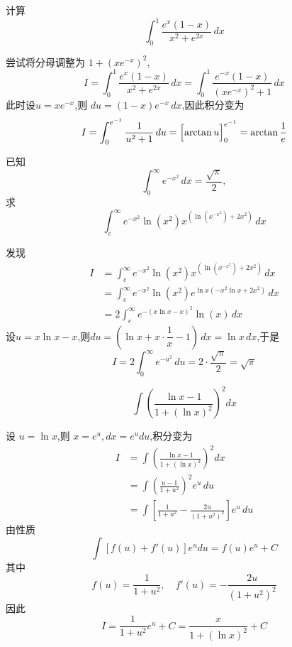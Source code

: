 \begin{questions}
    \question 计算
    \[
    \int_{0}^{1} \frac{e^{x}(1-x)}{x^2+e^{2x}} \, dx
    \]
    \begin{solution}
        尝试将分母调整为 $1+(xe^{-x})^2$,
        \[
        I=\int_{0}^{1} \frac{e^{x}(1-x)}{x^2+e^{2x}} \, dx = \int_{0}^{1} \frac{e^{-x}(1-x)}{(xe^{-x})^2+1} \, dx
        \]
        此时设$u = x e^{-x}$,则 $du = (1-x)e^{-x}\, dx$,因此积分变为
        \[
        I= \int_{0}^{e^{-1}} \frac{1}{u^2+1} \, du = \Bigl[\arctan u\Bigr]_{0}^{e^{-1}} = \arctan \frac{1}{e}
        \]
    \end{solution}

    \question 已知 
    \[
    \int_{0}^{\infty} e^{-x^2}\,dx = \frac{\sqrt{\pi}}{2},
    \]
    求
    \[
    \int_{e}^{\infty} e^{-x^2} \ln(x^2) x^{(\ln(x^{-x^2}) + 2x^2)}\,dx
    \]
    \begin{solution}
        发现
        \begin{align*} 
        I &= \int_{e}^{\infty} e^{-x^2} \ln(x^2) x^{(\ln(x^{-x^2}) + 2x^2)}\,dx \\
        &= \int_{e}^{\infty} e^{-x^2} \ln(x^2) e^{\ln x(-x^2 \ln x + 2x^2)}\,dx \\
        &= 2\int_{e}^{\infty} e^{-(x\ln x-x)^2} \ln(x) \,dx
        \end{align*}
        设$u=x\ln x -x$,则$du=\left(\ln x +x\cdot\dfrac{1}{x}-1\right)\,dx=\ln x \,dx$,于是
        \[
        I=2\int_{0}^{\infty}e^{-u^2}\,du=2\cdot\frac{\sqrt{\pi}}{2}=\sqrt{\pi}
        \]
    \end{solution}

    \question 
    \[ 
    \int \left( \frac{\ln x - 1}{1 + (\ln x)^2} \right)^2 dx 
    \]
    \begin{solution}
        设 $u = \ln x$,则 $x = e^u,dx = e^u du$,积分变为
        \begin{align*}
        I &= \int \left( \frac{\ln x - 1}{1 + (\ln x)^2} \right)^2 dx \\
        &= \int \left( \frac{u-1}{1+u^2} \right)^2 e^u \,du \\
        &= \int \left[ \frac{1}{1+u^2} - \frac{2u}{(1+u^2)^2} \right] e^u \,du
        \end{align*}
        由性质 
        \[
        \int [f(u) + f'(u)] e^u du = f(u)e^u + C
        \]
        其中 
        \[
        f(u) = \frac{1}{1+u^2},\quad f'(u) = -\frac{2u}{(1+u^2)^2}
        \]
        因此
        \[
        I = \frac{1}{1+u^2} e^u + C = \frac{x}{1+(\ln x)^2} + C
        \]
    \end{solution}


\end{questions}
